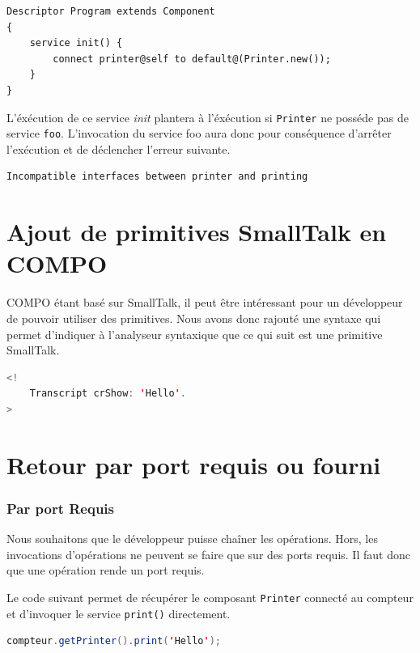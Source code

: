 \documentclass[11pt,a4paper,openany,oneside]{book}
\begin{document}
\begin{lstlisting}[language=Compo, frame=single, caption=Service qui lancera une exception lors de son invocation]
Descriptor Program extends Component
{
	service init() {
		connect printer@self to default@(Printer.new());
	}
}
\end{lstlisting}

L'éxécution de ce service \textit{init} plantera à l'éxécution si \texttt{Printer} ne posséde pas de service \texttt{foo}. L'invocation du service foo aura donc pour conséquence d'arrêter l'exécution et de déclencher l'erreur suivante.

\begin{lstlisting}[language=Compo, frame=single, caption=Message d'erreur lorsque les interfaces sont incompatibles]
Incompatible interfaces between printer and printing
\end{lstlisting}

\section{Ajout de primitives SmallTalk en COMPO}

COMPO étant basé sur SmallTalk, il peut être intéressant pour un développeur de pouvoir utiliser des primitives.
Nous avons donc rajouté une syntaxe qui permet d'indiquer à l'analyseur syntaxique que ce qui suit est une primitive SmallTalk. 

\begin{lstlisting}[language=JAVA, frame=single, caption=Syntaxe d'une primitive smalltalk en COMPO]
<! 
    Transcript crShow: 'Hello'.
>
\end{lstlisting}

\section{Retour par port requis ou fourni}

\subsubsection{Par port Requis}
Nous souhaitons que le développeur puisse chaîner les opérations. Hors, les invocations d'opérations ne peuvent se faire que sur des ports requis. Il faut donc que une opération rende un port requis.

Le code suivant permet de récupérer le composant \texttt{Printer} connecté au compteur et d'invoquer le service \texttt{print()} directement.
\begin{lstlisting}[language=JAVA, frame=single, caption=Syntaxe d'un chaînage d'incocation en COMPO]
compteur.getPrinter().print('Hello');
\end{lstlisting}
\end{document}
